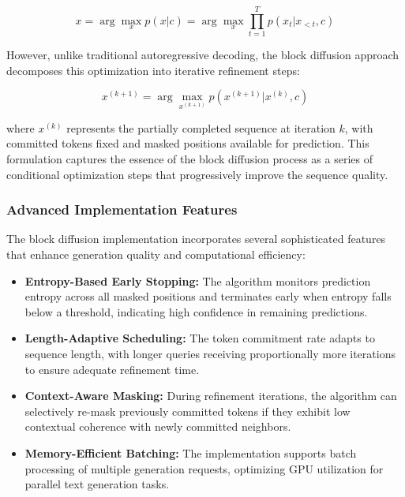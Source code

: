 \documentclass[a4paper,12pt]{article}
\begin{document}
\begin{equation}
x = \arg\max_{x} p(x|c) = \arg\max_{x} \prod_{t=1}^T p(x_t | x_{<t}, c)
\end{equation}

However, unlike traditional autoregressive decoding, the block diffusion approach decomposes this optimization into iterative refinement steps:

\begin{equation}
x^{(k+1)} = \arg\max_{x^{(k+1)}} p(x^{(k+1)} | x^{(k)}, c)
\end{equation}

where $x^{(k)}$ represents the partially completed sequence at iteration $k$, with committed tokens fixed and masked positions available for prediction. This formulation captures the essence of the block diffusion process as a series of conditional optimization steps that progressively improve the sequence quality.

\subsubsection*{Advanced Implementation Features}
The block diffusion implementation incorporates several sophisticated features that enhance generation quality and computational efficiency:

\begin{itemize}
    \item \textbf{Entropy-Based Early Stopping:} The algorithm monitors prediction entropy across all masked positions and terminates early when entropy falls below a threshold, indicating high confidence in remaining predictions.
    
    \item \textbf{Length-Adaptive Scheduling:} The token commitment rate adapts to sequence length, with longer queries receiving proportionally more iterations to ensure adequate refinement time.
    
    \item \textbf{Context-Aware Masking:} During refinement iterations, the algorithm can selectively re-mask previously committed tokens if they exhibit low contextual coherence with newly committed neighbors.
    
    \item \textbf{Memory-Efficient Batching:} The implementation supports batch processing of multiple generation requests, optimizing GPU utilization for parallel text generation tasks.
\end{itemize}
\end{document}
